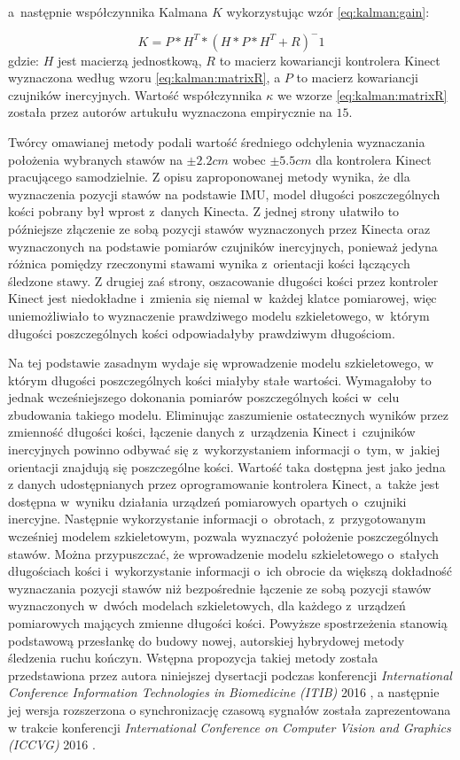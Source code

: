 a~następnie współczynnika Kalmana $K$ wykorzystując wzór \ref{eq:kalman:gain}:
											
\begin{equation}
	K = P * H^T * (H * P * H^T +R)^-1
	\label{eq:kalman:gain}
\end{equation}
gdzie: $H$ jest macierzą jednostkową, $R$ to macierz kowariancji kontrolera Kinect wyznaczona według wzoru \ref{eq:kalman:matrixR}, a $P$ to macierz kowariancji czujników inercyjnych. Wartość współczynnika $\kappa$ we wzorze \ref{eq:kalman:matrixR} została przez autorów artukułu wyznaczona empirycznie na $15$.

Twórcy omawianej metody podali wartość średniego odchylenia wyznaczania położenia wybranych stawów na $\pm 2.2cm$ wobec $\pm 5.5cm$ dla kontrolera Kinect pracującego samodzielnie. Z opisu zaproponowanej metody wynika, że dla wyznaczenia pozycji stawów na podstawie IMU, model długości poszczególnych kości pobrany był wprost z~danych Kinecta. Z jednej strony ułatwiło to późniejsze złączenie ze sobą pozycji stawów wyznaczonych przez Kinecta oraz wyznaczonych na podstawie pomiarów czujników inercyjnych, ponieważ jedyna różnica pomiędzy rzeczonymi stawami wynika z~orientacji kości łączących śledzone stawy. Z drugiej zaś strony, oszacowanie długości kości przez kontroler Kinect jest niedokładne i~zmienia się niemal w~każdej klatce pomiarowej, więc uniemożliwiało to wyznaczenie prawdziwego modelu szkieletowego, w~którym długości poszczególnych kości odpowiadałyby prawdziwym długościom.

Na tej podstawie zasadnym wydaje się wprowadzenie modelu szkieletowego, w którym długości poszczególnych kości miałyby stałe wartości. Wymagałoby to jednak wcześniejszego dokonania pomiarów poszczególnych kości w~celu zbudowania takiego modelu. Eliminując zaszumienie ostatecznych wyników przez zmienność długości kości, łączenie danych z~urządzenia Kinect i~czujników inercyjnych powinno odbywać się z~wykorzystaniem informacji o~tym, w~jakiej orientacji znajdują się poszczególne kości. Wartość taka dostępna jest jako jedna z danych udostępnianych przez oprogramowanie kontrolera Kinect, a~także jest dostępna w~wyniku działania urządzeń pomiarowych opartych o~czujniki inercyjne. Następnie wykorzystanie informacji o~obrotach, z~przygotowanym wcześniej modelem szkieletowym, pozwala wyznaczyć położenie poszczególnych stawów. Można przypuszczać, że wprowadzenie modelu szkieletowego o~stałych długościach kości i~wykorzystanie informacji o~ich obrocie da większą dokładność wyznaczania pozycji stawów niż bezpośrednie łączenie ze sobą pozycji stawów wyznaczonych w~dwóch modelach szkieletowych, dla każdego z~urządzeń pomiarowych mających zmienne długości kości. Powyższe spostrzeżenia stanowią podstawową przesłankę do budowy nowej, autorskiej hybrydowej metody śledzenia ruchu kończyn. Wstępna propozycja takiej metody została przedstawiona przez autora niniejszej dysertacji podczas konferencji \emph{International Conference Information Technologies in Biomedicine (ITIB)} 2016 \cite{Glonek_Wojciechowski_2016_ITIB}, a następnie jej wersja rozszerzona o synchronizację czasową sygnałów została zaprezentowana w trakcie konferencji \emph{International Conference on Computer Vision and Graphics (ICCVG)} 2016 \cite{Glonek_Wojciechowski_2016_ICCVG}.